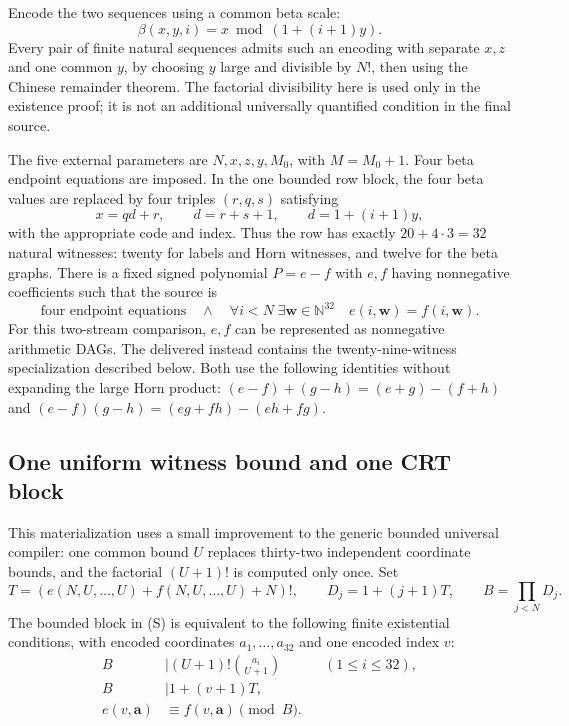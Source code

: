 \documentclass[11pt]{article}
\begin{document}
Encode the two sequences using a common beta scale:
\[
 \beta(x,y,i)=x\bmod(1+(i+1)y).
\]
Every pair of finite natural sequences admits such an encoding with
separate $x,z$ and one common $y$, by choosing $y$ large and divisible by
$N!$, then using the Chinese remainder theorem. The factorial divisibility
here is used only in the existence proof; it is not an additional
universally quantified condition in the final source.

The five external parameters are $N,x,z,y,M_0$, with $M=M_0+1$.
Four beta endpoint equations are imposed. In the one bounded row block,
the four beta values are replaced by four triples $(r,q,s)$ satisfying
\[
 x=qd+r,\qquad d=r+s+1,\qquad d=1+(i+1)y,
\]
with the appropriate code and index. Thus the row has exactly
$20+4\cdot3=32$ natural witnesses: twenty for labels and Horn witnesses,
and twelve for the beta graphs. There is a fixed signed polynomial
$P=e-f$ with $e,f$ having nonnegative coefficients such that the source is
\[
 \text{four endpoint equations}\quad\land\quad
 \forall i<N\;\exists\boldsymbol w\in\mathbb N^{32}\quad
 e(i,\boldsymbol w)=f(i,\boldsymbol w).
 \tag{S}
\]
For this two-stream comparison, $e,f$ can be represented as nonnegative
arithmetic DAGs. The delivered  instead
contains the twenty-nine-witness specialization described below. Both use
the following identities without expanding the large Horn product:
$(e-f)+(g-h)=(e+g)-(f+h)$ and
$(e-f)(g-h)=(eg+fh)-(eh+fg)$.

\subsection{One uniform witness bound and one CRT block}

This materialization uses a small improvement to the generic bounded
universal compiler: one common bound $U$ replaces thirty-two independent
coordinate bounds, and the factorial $(U+1)!$ is computed only once.
Set
\[
 T=(e(N,U,\ldots,U)+f(N,U,\ldots,U)+N)!,\qquad
 D_j=1+(j+1)T,\qquad B=\prod_{j<N}D_j.
\]
The bounded block in (S) is equivalent to the following finite
existential conditions, with encoded coordinates $a_1,\ldots,a_{32}$
and one encoded index $v$:
\begin{align*}
 B&\mid (U+1)!\binom{a_i}{U+1} &&(1\leq i\leq32),\\
 B&\mid 1+(v+1)T,\\
 e(v,\boldsymbol a)&\equiv f(v,\boldsymbol a)\pmod B.
\end{align*}
\end{document}
